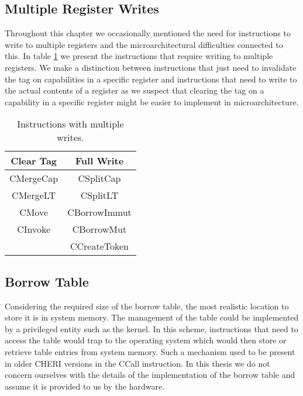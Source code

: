 \subsection{Multiple Register Writes}
Throughout this chapter we occasionally mentioned the need for instructions to write to multiple registers and the microarchitectural difficulties connected to this. In table \ref{table:multiplewrites} we present the instructions that require writing to multiple registers. We make a distinction between instructions that just need to invalidate the tag on capabilities in a specific register and instructions that need to write to the actual contents of a register as we suspect that clearing the tag on a capability in a specific register might be easier to implement in microarchitecture.
\begin{table}[h]
\centering
\begin{tabular}{| c | c |}
\hline
Clear Tag & Full Write \\
\hline
 CMergeCap & CSplitCap \\
 CMergeLT & CSplitLT \\
 CMove & CBorrowImmut \\
 CInvoke & CBorrowMut \\
 & CCreateToken \\
\hline
\end{tabular}
\caption{Instructions with multiple writes.}
\label{table:multiplewrites}
\end{table}

\subsection{Borrow Table}
\label{sec:microarchbt}
Considering the required size of the borrow table, the most realistic location to store it is in system memory. The management of the table could be implemented by a privileged entity such as the kernel. In this scheme, instructions that need to access the table would trap to the operating system which would then store or retrieve table entries from system memory. Such a mechanism used to be present in older CHERI versions in the CCall instruction. %
In this thesis we do not concern ourselves with the details of the implementation of the borrow table and assume it is provided to us by the hardware.

